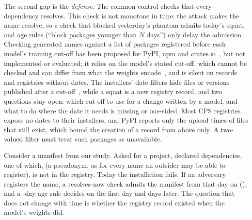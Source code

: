 \documentclass[conference]{IEEEtran}
\begin{document}
The second gap is the \emph{defense}. The common control checks that every dependency resolves. This check is not
monotone in time: the attack makes the name resolve, so a check that blocked yesterday's phantom admits today's squat,
and age rules (``block packages younger than $N$ days'') only delay the admission. Checking generated names against a
list of packages registered before each model's training cut-off has been proposed for PyPI, npm and
crates.io~\cite{krishna2025phantoms}, but not implemented or evaluated; it relies on the model's stated cut-off, which
cannot be checked and can differ from what the weights encode~\cite{cheng2024dated}, and is silent on records and
registries without dates. The installers' date filters hide files or versions published after a
cut-off~\cite{npmconfig,uvresolution}, while a squat is a new registry record, and two questions stay open: which
cut-off to use for a change written by a model, and what to do where the date it needs is missing or one-sided. Most CPS registries expose no dates to their installers, and PyPI
reports only the upload times of files that still exist, which bound the creation of a record from above only. A
two-valued filter must treat such packages as unavailable.

\ifnum{}
Consider a manifest from our study. Asked for a \rExTaskEco{} project, \rExModel{} declared
\rExNDeps{} dependencies, one of which, \rExPhantom\ifnum{} (a pseudonym, as for every name an outsider may
be able to register)\fi, is not in the registry. Today the installation fails. If an
adversary registers the name, a resolves-now check admits the manifest from that day on (\rExSqPOneDec), and a
\rAgeDays-day age rule decides \rExSqPTwoDayZeroDec{} on the first day and \rExSqPTwoMonthDec{} \rAgeDays{} days later. The
question that does not change with time is whether the registry record existed when the model's weights did.
\fi
\end{document}
